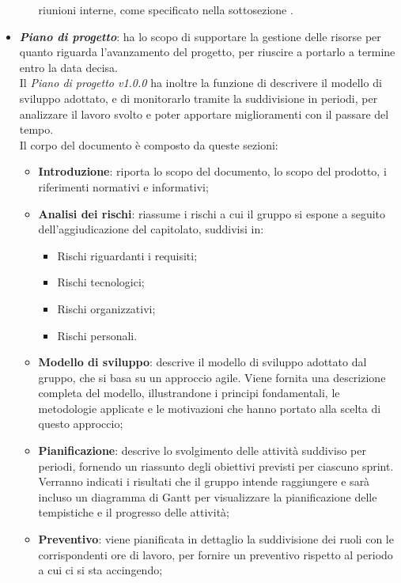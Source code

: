 \begin{itemize}
\begin{itemize}
                        riunioni interne, come specificato nella sottosezione .
            \end{itemize}
      \item \textit{\textbf{Piano di progetto}}: ha lo scopo di supportare la gestione delle risorse per quanto riguarda l'avanzamento del progetto, per riuscire a portarlo a termine entro la data decisa.\\
            Il \textit{Piano di progetto v1.0.0} ha inoltre la funzione di descrivere il modello di sviluppo adottato, e di monitorarlo tramite la suddivisione in periodi, per analizzare il lavoro svolto e poter apportare miglioramenti con il passare del tempo.
            \\Il corpo del documento è composto da queste sezioni:
            \begin{itemize}
                  \item \textbf{Introduzione}: riporta lo scopo del documento, lo scopo del prodotto, i riferimenti normativi e informativi;
                  \item \textbf{Analisi dei rischi}: riassume i rischi a cui il gruppo si espone a seguito dell'aggiudicazione del capitolato, suddivisi in:
                        \begin{itemize}
                              \item Rischi riguardanti i requisiti;
                              \item Rischi tecnologici;
                              \item Rischi organizzativi;
                              \item Rischi personali.
                        \end{itemize}
                  \item \textbf{Modello di sviluppo}: descrive il modello di sviluppo adottato dal gruppo, che si basa su un approccio agile. Viene fornita una descrizione completa del modello, illustrandone i principi fondamentali, le metodologie applicate e le motivazioni che hanno portato alla scelta di questo approccio;
                  \item \textbf{Pianificazione}: descrive lo svolgimento delle attività suddiviso per periodi, fornendo un riassunto degli obiettivi previsti per ciascuno sprint. Verranno indicati i risultati che il gruppo intende raggiungere e sarà incluso un diagramma di Gantt per visualizzare la pianificazione delle tempistiche e il progresso delle attività;
                  \item \textbf{Preventivo}: viene pianificata in dettaglio la suddivisione dei ruoli con le corrispondenti ore di lavoro, per fornire un preventivo rispetto al periodo a cui ci si sta accingendo;

\end{itemize}
\end{itemize}
